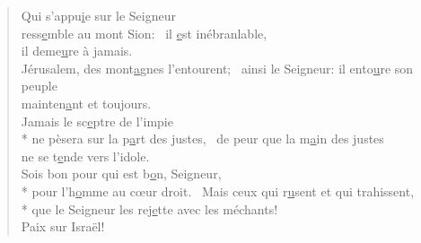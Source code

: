 
\begin{verse}
Qui s’appu\underline{i}e sur le Seigneur \\
ress\underline{e}mble au mont Sion:~\psalmstar
il \underline{e}st inébranlable, \\
il deme\underline{u}re à jamais. \\

Jérusalem, des mont\underline{a}gnes l’entourent;~\psalmstar
ainsi le Seigneur: il ento\underline{u}re son peuple \\
mainten\underline{a}nt et toujours. \\

Jamais le sc\underline{e}ptre de l’impie \\*
ne pèsera sur la p\underline{a}rt des justes,~\psalmstar
de peur que la m\underline{a}in des justes \\
ne se t\underline{e}nde vers l’idole. \\

Sois bon pour qui est b\underline{o}n, Seigneur, \\*
pour l’h\underline{o}mme au cœur droit.~\psalmstar
{}Mais ceux qui r\underline{u}sent et qui trahissent, \\*
que le Seigneur les rej\underline{e}tte avec les méchants! \\

Paix sur Israël! \\
\end{verse}

